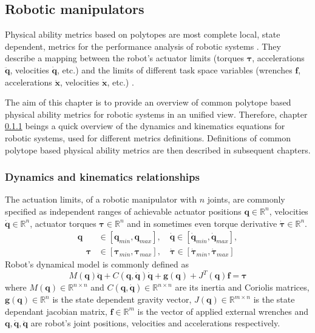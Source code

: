\subsection{Robotic manipulators}
\label{ch:robot_metrics}

Physical ability metrics based on polytopes are most complete local, state dependent, metrics for the performance analysis of robotic systems \cite{pholsiri2005real,Finotello1998}. They describe a mapping between the robot's actuator limits (torques $\bm{\tau}$, accelerations $\ddot{\bm{q}}$, velocities $\dot{\bm{q}}$, etc.) and the limits of different task space variables (wrenches $\bm{f}$, accelerations $\ddot{\bm{x}}$, velocities $\dot{\bm{x}}$, etc.) . 

The aim of this chapter is to provide an overview of common polytope based physical ability metrics for robotic systems in an unified view.  Therefore, chapter \ref{ch:robot_dyn_kin} beings a quick overview of the dynamics and kinematics equations for robotic systems, used for different metrics definitions. Definitions 
of common polytope based physical ability metrics are then described in subsequent chapters.

\subsubsection{Dynamics and kinematics relationships}
\label{ch:robot_dyn_kin}
The actuation limits, of a robotic manipulator with $n$ joints, are commonly specified as independent ranges of achievable actuator positions $\bm{q}\in \mathbb{R}^n$, velocities $\dot{\bm{q}}\in \mathbb{R}^n$, actuator torques $\bm{\tau}\in \mathbb{R}^n$ and in sometimes even torque derivative $\dot{\bm{\tau}}\in \mathbb{R}^n$.
\begin{subequations}
\begin{align}
\bm{q} &\in [ {\bm{q}}_{min}, {\bm{q}}_{max}], \quad\dot{\bm{q}} \in [\dot{\bm{q}}_{min},  \dot{\bm{q}}_{max}], \\
\quad\bm{\tau} &\in [\bm{\tau}_{min},  \bm{\tau}_{max}],
\quad\dot{\bm{\tau}} \in [\dot{\bm{\tau}}_{min},  \dot{\bm{\tau}}_{max}] \label{eq:dyn_limits:torque}
\end{align}
\label{eq:dyn_limits}
\end{subequations}
Robot's dynamical model is commonly defined as
\begin{equation}
M(\bm{q})\ddot{\bm{q}} + C(\bm{q},\dot{\bm{q}})\dot{\bm{q}} + \bm{g}(\bm{q}) + J^T(\bm{q})\bm{f} = \bm{\tau} 
\label{eq:dyn_model_rob}
\end{equation}
where $M(\bm{q}) \in \mathbb{R}^{n \times n}$ and $C(\bm{q},\dot{\bm{q}})\in \mathbb{R}^{n \times n}$ are its inertia and Coriolis matrices, $\bm{g} (\bm{q})\in \mathbb{R}^n$ is the state dependent gravity vector, $J(\bm{q}) \in \mathbb{R}^{m\times n}$ is the state dependant jacobian matrix, $\bm{f}\in \mathbb{R}^m $ is the vector of applied external wrenches and $\bm{q},\dot{\bm{q}},\ddot{\bm{q}}$ are robot's joint positions, velocities and accelerations respectively.

